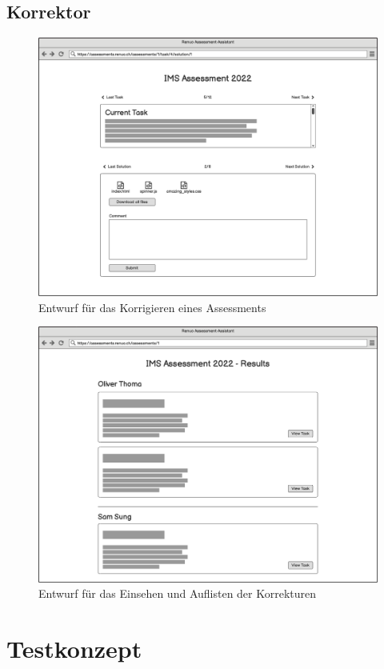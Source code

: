 \subsection{Korrektor}
\begin{figure}[H]
    \centering
    \includegraphics[width=12cm]{images/mockups/corrector-correct-assessment.png}
    \caption{\label{fig:mockup-solve-assessment}Entwurf für das Korrigieren eines Assessments}
\end{figure}
\begin{figure}[H]
    \centering
    \includegraphics[width=12cm]{images/mockups/assessment-results.png}
    \caption{\label{fig:mockup-assessment-results}Entwurf für das Einsehen und Auflisten der Korrekturen}
\end{figure}

\newpage

\section{Testkonzept}

